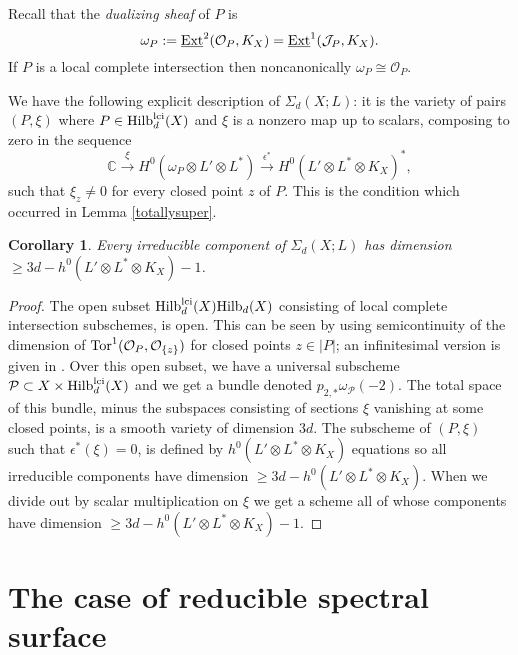 \documentclass{amsart}
\theoremstyle{plain}
\newtheorem{corollary}[theorem]{Corollary}
\numberwithin{equation}{section}
\begin{document}
Recall that the {\em dualizing sheaf} of $P$ is 
\begin{equation}
\label{wP}
\omega _P := {\underline{{\rm Ext}}} ^2({{\mathcal O}} _{P},K_X) = {\underline{{\rm Ext}}} ^1({{\mathcal J}} _P, K_X).
\end{equation}
If $P$ is a local complete intersection then noncanonically $\omega _P\cong {{\mathcal O}} _P$.

We have the following explicit description of $\Sigma _d(X; L)$: it is
the variety of pairs $(P, \xi )$ where $P\in {{\rm Hilb}} ^{\rm lci}_d(X)$
and $\xi$ is a nonzero map up to scalars, composing to zero
in the sequence
\begin{equation}
\label{xiseq}
{{\mathbb C}} \stackrel{\xi}{\rightarrow} H^0(\omega _P\otimes L'\otimes L^{\ast})
\stackrel{\epsilon ^{\ast}}{\rightarrow} 
H^0(L'\otimes L^{\ast} \otimes K_X)^{\ast},
\end{equation}
such that $\xi _z\neq 0$ for every closed point $z$ of $P$. This is the condition
which occurred in Lemma \ref{totallysuper}.  

\begin{corollary}
\label{dimsigmageq}
Every irreducible component of $\Sigma _d(X; L)$ has dimension 
$\geq 3d-h^0(L'\otimes L^{\ast} \otimes K_X)-1$.
\end{corollary}
\begin{proof}
The open subset  ${{\rm Hilb}} _d^{\rm lci}(X){{\rm Hilb}} _d(X)$ consisting of 
local complete intersection subschemes, is open. This can be seen by 
using semicontinuity of the dimension of ${\rm Tor}^1({{\mathcal O}} _P,{{\mathcal O}} _{\{ z\}})$
for closed points $z\in |P|$; an infinitesimal version is given in 
\cite{Vistoli}.  Over this open subset, we have a universal subscheme ${{\mathcal P}} \subset 
X\times {{\rm Hilb}} _d^{\rm lci}(X)$ and we get a bundle denoted 
$p_{2,\ast}\omega _{{\mathcal P}}(-2)$. The total space of this bundle, minus the subspaces
consisting of sections $\xi$ vanishing at some closed points, is a smooth 
variety of dimension $3d$. The subscheme of $(P,\xi  )$ such that 
$\epsilon ^{\ast}(\xi  )=0$, is defined by $h^0(L'\otimes L^{\ast} \otimes K_X)$ equations so all irreducible
components have dimension $\geq 3d-h^0(L'\otimes L^{\ast} \otimes K_X)$. When we divide out by scalar multiplication
on $\xi$ we get a scheme all of whose components have dimension $\geq 3d-
h^0(L'\otimes L^{\ast} \otimes K_X) -1$.
\end{proof}

\section{The case of reducible spectral surface}
\label{sec-reducible}
\end{document}
